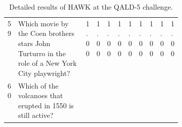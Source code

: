 \begin{table}[tb!]
\begin{tabular}{@{}lp{0.4\linewidth}lllllllll@{}}
59       & Which movie by the Coen brothers stars John Turturro in the role of a New York City playwright?             & 1.00                        & 1.00                         & 1.00                         & 1.00                      & 1.00                      & 1.00                      & 1.00                     & 1.00                     & 1.00                     \\
60       & Which of the volcanoes that erupted in 1550 is still active?                                                & \cellcolor[HTML]{BBDAFF}    & \cellcolor[HTML]{BBDAFF}     & \cellcolor[HTML]{BBDAFF}     & \cellcolor[HTML]{BBDAFF}  & \cellcolor[HTML]{BBDAFF}  & \cellcolor[HTML]{BBDAFF}  & \cellcolor[HTML]{BBDAFF} & \cellcolor[HTML]{BBDAFF} & \cellcolor[HTML]{BBDAFF} \\ \bottomrule
\end{tabular}

\caption{Detailed results of HAWK at the QALD-5 challenge.}
\label{tab:eval_qal5_detail}

\end{table}
